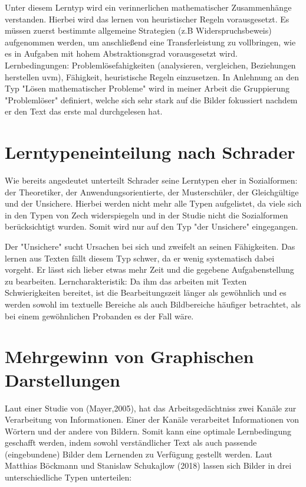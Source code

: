 Unter diesem Lerntyp wird ein verinnerlichen mathematischer Zusammenhänge verstanden. Hierbei wird das lernen von heuristischer Regeln vorausgesetzt. Es müssen zuerst bestimmte allgemeine Strategien (z.B Widerspruchsbeweis) aufgenommen werden, um anschließend eine Transferleistung zu vollbringen, wie es in Aufgaben mit hohem Abstraktionsgrad vorausgesetzt wird. 
Lernbedingungen: Problemlösefahigkeiten (analysieren, vergleichen, Beziehungen herstellen uvm), Fähigkeit, heuristische Regeln einzusetzen.
In Anlehnung an den Typ "Lösen mathematischer Probleme" wird in meiner Arbeit die Gruppierung "Problemlöser" definiert, welche sich sehr stark auf die Bilder fokussiert nachdem er den Text das erste mal durchgelesen hat.

\section{Lerntypeneinteilung nach Schrader}

Wie bereits angedeutet unterteilt Schrader seine Lerntypen eher in Sozialformen: der Theoretiker, der Anwendungsorientierte, der Musterschüler, der Gleichgültige und der Unsichere. Hierbei werden nicht mehr alle Typen aufgelistet, da viele sich in den Typen von Zech widerspiegeln und in der Studie nicht die Sozialformen berücksichtigt wurden. Somit wird nur auf den Typ "der Unsichere" eingegangen.

Der "Unsichere" sucht Ursachen bei sich und zweifelt an seinen Fähigkeiten. Das lernen aus Texten fällt diesem Typ schwer, da er wenig systematisch dabei vorgeht. Er lässt sich lieber etwas mehr Zeit und die gegebene Aufgabenstellung zu bearbeiten.
Lerncharakteristik: Da ihm das arbeiten mit Texten Schwierigkeiten bereitet, ist die Bearbeitungszeit länger als gewöhnlich und es werden sowohl im textuelle Bereiche als auch Bildbereiche häufiger betrachtet, als bei einem gewöhnlichen Probanden es der Fall wäre. 

\section{Mehrgewinn von Graphischen Darstellungen}

Laut einer Studie von (Mayer,2005), hat das Arbeitsgedächtniss zwei Kanäle zur Verarbeitung von Informationen. Einer der Kanäle verarbeitet Informationen von Wörtern und der andere von Bildern. Somit kann eine optimale Lernbedingung geschafft werden, indem sowohl verständlicher Text als auch passende (eingebundene) Bilder dem Lernenden zu Verfügung gestellt werden. Laut Matthias Böckmann und Stanislaw Schukajlow (2018) lassen sich Bilder in drei unterschiedliche Typen unterteilen:
    
